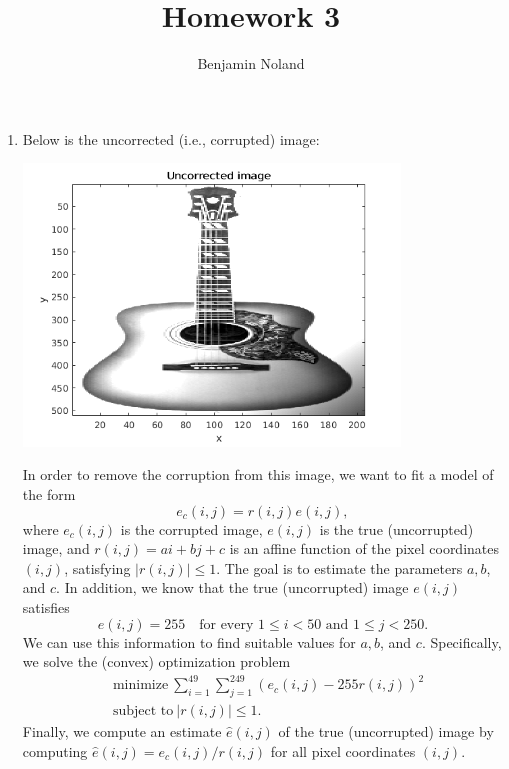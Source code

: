 \documentclass[letterpaper,12pt]{article}
\title{Homework 3}
\author{Benjamin Noland}
\date{}
\begin{document}
\maketitle

\begin{enumerate}
\item Below is the uncorrected (i.e., corrupted) image:
  \begin{center}
    \includegraphics[width=10cm]{uncorrected_image.png}
  \end{center}
  In order to remove the corruption from this image, we want to fit a
  model of the form
  \begin{equation*}
    e_c(i, j) = r(i, j) e(i, j),
  \end{equation*}
  where $e_c(i, j)$ is the corrupted image, $e(i, j)$ is the true
  (uncorrupted) image, and $r(i, j) = ai + bj + c$ is an affine
  function of the pixel coordinates $(i, j)$, satisfying
  $|r(i, j)| \leq 1$. The goal is to estimate the parameters $a, b$,
  and $c$. In addition, we know that the true (uncorrupted) image
  $e(i, j)$ satisfies
  \begin{equation*}
    e(i, j) = 255 \quad \text{for every $1 \leq i < 50$ and $1 \leq j < 250$}.
  \end{equation*}
  We can use this information to find suitable values for $a, b$, and
  $c$. Specifically, we solve the (convex) optimization problem
  \begin{align*}
    &\text{minimize} \
      \sum_{i=1}^{49} \sum_{j=1}^{249} (e_c(i, j) - 255 r(i, j))^2 \\
    &\text{subject to} \ |r(i, j)| \leq 1.
  \end{align*}
  Finally, we compute an estimate $\hat{e}(i, j)$ of the true
  (uncorrupted) image by computing
  $\hat{e}(i, j) = e_c(i, j) / r(i, j)$ for all pixel coordinates
  $(i, j)$.


\end{enumerate}
\end{document}
